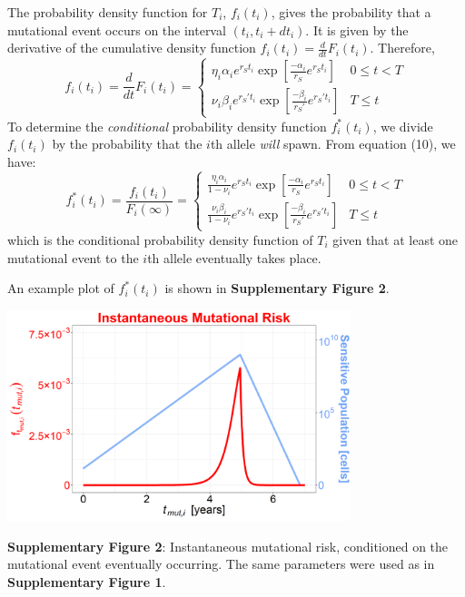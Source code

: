 \documentclass{article}
\begin{document}
The probability density function for $T_i$, $f_i(t_i)$, gives the probability that a mutational event occurs on the interval $(t_i,t_i+dt_i)$.  It is given by the derivative of the cumulative density function $f_i(t_i) = \frac{d}{dt}F_i(t_i)$.  Therefore,  
\begin{equation}
f_i(t_i)=\frac{d}{dt}F_i(t_i)=  \begin{cases}
		\eta_i \alpha_i e^{r_S t_i} \exp[\frac{-\alpha_i}{r_S} e^{r_S t_i}] & 0 \leq t < T \\
		\nu_i \beta_i e^{r_S' t_i} \exp[\frac{-\beta_i}{r_S'} e^{r_S' t_i}] & T \leq t
       \end{cases}
\end{equation}
To determine the \textit{conditional} probability density function $f_i^*(t_i)$, we divide $f_i(t_i)$ by the probability that the $i$th allele \textit{will} spawn.  From equation (10), we have:
\begin{equation}
f_i^*(t_i) = \frac{f_i(t_i)}{F_i(\infty)}=\begin{cases}
		\frac{\eta_i \alpha_i}{1-\nu_i} e^{r_S t_i} \exp[\frac{-\alpha_i}{r_S} e^{r_S t_i}] & 0 \leq t < T \\
		\frac{\nu_i \beta_i}{1-\nu_i} e^{r_S' t_i} \exp[\frac{-\beta_i}{r_S'} e^{r_S' t_i}] & T \leq t
       \end{cases}
\end{equation}
which is the conditional probability density function of $T_{i}$ given that at least one mutational event to the $i$th allele eventually takes place. 

An example plot of $f_i^*(t_{i})$ is shown in \textbf{Supplementary Figure 2}.

\begin{center}
\includegraphics[width=0.75\textwidth]{InstMutRisk}

\textbf{Supplementary Figure 2}: Instantaneous mutational risk, conditioned on the mutational event eventually occurring.  The same parameters were used as in \textbf{Supplementary Figure 1}.
\end{center}
\end{document}
